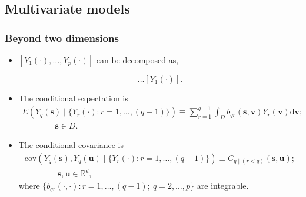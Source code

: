 \documentclass{beamer}
\newcommand{\intd} {\mathrm{d}}
\newcommand{\svec} {\textbf{s}}
\newcommand{\uvec} {\textbf{u}}
\renewcommand{\v}{\mathbf{v}}
\newcommand{\E}{E}
\newcommand{\cov}{\mathrm{cov}}
\begin{document}

\subsection{Multivariate models}

\begin{frame}
\frametitle{Beyond two dimensions}

\begin{itemize}
\item  $[Y_1(\cdot),\dots,Y_p(\cdot)]$ can be decomposed as,

\begin{equation*}
[Y_p(\cdot) \mid  Y_{p-1}(\cdot),Y_{p-2}(\cdot),\dots,Y_1(\cdot)]\dots [Y_1(\cdot)].                  \end{equation*}

\item The conditional expectation is
\begin{align*}
\E(Y_q(\svec) \mid  \{Y_r(\cdot) : r = 1,\dots,(q-1)\}) \equiv \sum_{r = 1}^{q-1} \int_D b_{qr}(\svec,\v)Y_r(\v) \intd \v; \\
 \qquad \qquad \svec \in D.
\end{align*}

\item The conditional covariance is
\begin{align*}
\cov(Y_q(\svec), Y_q(\uvec) \mid  \{Y_r(\cdot) : r = 1,\dots,(q-1)\}) \equiv C_{q \mid  (r < q)}(\svec,\uvec);\\  \qquad\qquad \svec,\uvec \in \mathbb{R}^d,
\end{align*}
where $\{b_{qr}(\cdot,\cdot) : r = 1,\dots,(q-1) ;~q = 2,\dots,p\}$ are integrable.

\end{itemize}
\end{frame}

\end{document}
